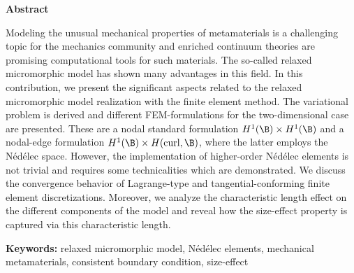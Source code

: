 \thispagestyle{empty}



\vspace{4mm}

\vspace{4mm}

\vspace{4mm}

\vspace{4mm}

    
\vspace{4mm}
\begin{center}
{\bf \large Abstract}
\bigskip

{\footnotesize
\begin{minipage}{14.5cm}
\noindent
Modeling the unusual mechanical properties of  metamaterials is a challenging topic for the mechanics community and enriched continuum theories are promising computational tools for such materials. The so-called relaxed micromorphic model has shown many advantages in this field. In this contribution, we present the significant aspects related to the relaxed micromorphic model realization with the finite element method. The  variational problem is derived and different FEM-formulations for the two-dimensional case are presented. These are a nodal standard formulation $H^1(\B) \times H^1(\B)$ and a nodal-edge formulation $H^1(\B) \times H(\curl, \B)$, where the latter employs the N\'ed\'elec space. However, the implementation of higher-order N\'ed\'elec elements is not trivial and requires some technicalities which are demonstrated. We discuss the convergence behavior of Lagrange-type and tangential-conforming finite element discretizations. Moreover, we analyze the characteristic length effect on the different components of the model and reveal how the size-effect property is captured via this characteristic length. 
\end{minipage}
}
\end{center}

{\bf Keywords:} 
relaxed micromorphic model,
N\'ed\'elec elements, 
mechanical metamaterials, 
consistent boundary condition,
size-effect




